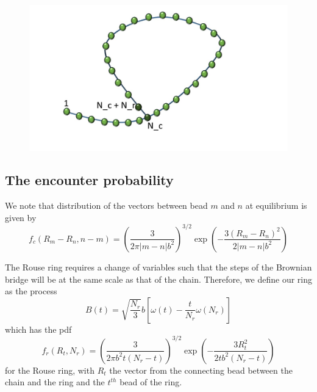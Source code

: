 \documentclass{report}
\begin{document}
\begin{figure}[h!]
\includegraphics[scale=0.2]{chainAndRing}
\end{figure}

\subsection{The encounter probability}\label{subsection_theEncounterProbabilityChainAndRing}
We note that distribution of the vectors between bead $m$ and $n$ at equilibrium is given by 
\begin{equation*}
f_c(R_m-R_n,n-m)= \left(\frac{3}{2\pi|m-n|b^2 }\right)^{3/2}\exp(-\frac{3(R_m-R_n)^2}{2|m-n|b^2})
\end{equation*}

The Rouse ring requires a change of variables such that the steps of the Brownian bridge will be at the same scale as that of the chain. Therefore, we define our ring as the process 
\begin{equation*}
B(t)= \sqrt{\frac{N_r}{3}}b[\omega(t)-\frac{t}{N_r}\omega(N_r)]
\end{equation*}
which has the pdf 
\begin{equation*}
f_r(R_t,N_r) = \left(\frac{3}{2\pi b^2t(N_r-t)}\right)^{3/2} \exp \left(-\frac{3R_t^2}{2tb^2(N_r-t)}\right)
\end{equation*}
for the Rouse ring, with $R_t$ the vector from the connecting bead between the chain and the ring and the $t^{th}$ bead of the ring. 
\end{document}
